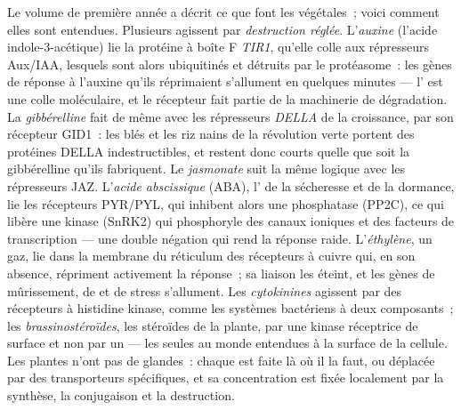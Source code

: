 \begin{definition}\label{def:b3:plant-molecular-physiology:hormones}
Le volume de première année a décrit ce que font les 
végétales~; voici comment elles sont entendues. Plusieurs agissent par
\emph{destruction réglée}. L'\emph{auxine} (l'acide indole-3-acétique)
lie la protéine à boîte F \emph{TIR1}, qu'elle colle aux répresseurs
Aux/IAA, lesquels sont alors ubiquitinés et détruits par le protéasome~:
les gènes de réponse à l'auxine qu'ils réprimaient s'allument en
quelques minutes --- l' est une colle moléculaire, et le
récepteur fait partie de la machinerie de dégradation. La
\emph{gibbérelline} fait de même avec les répresseurs \emph{DELLA} de la
croissance, par son récepteur GID1~: les blés et les riz nains de la
révolution verte portent des protéines DELLA indestructibles, et restent
donc courts quelle que soit la gibbérelline qu'ils fabriquent. Le
\emph{jasmonate} suit la même logique avec les répresseurs JAZ.
L'\emph{acide abscissique} (ABA), l' de la sécheresse et de la
dormance, lie les récepteurs PYR/PYL, qui inhibent alors une phosphatase
(PP2C), ce qui libère une kinase (SnRK2) qui phosphoryle des canaux
ioniques et des facteurs de transcription --- une double négation qui
rend la réponse raide. L'\emph{éthylène}, un gaz, lie dans la membrane
du réticulum des récepteurs à cuivre qui, en son absence, répriment
activement la réponse~; sa liaison les éteint, et les gènes de
mûrissement, de  et de stress s'allument. Les
\emph{cytokinines} agissent par des récepteurs à histidine kinase, comme
les systèmes bactériens à deux composants~; les
\emph{brassinostéroïdes}, les stéroïdes de la plante, par une kinase
réceptrice de surface et non par un  --- les seules
 au monde entendues à la surface de la cellule. Les
plantes n'ont pas de glandes~: chaque  est faite là où il la
faut, ou déplacée par des transporteurs spécifiques, et sa concentration
est fixée localement par la synthèse, la conjugaison et la destruction.
\end{definition}

